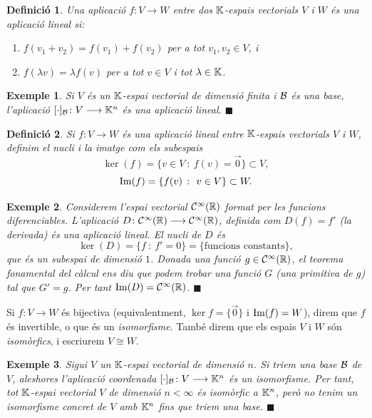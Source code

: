 \documentclass[
  11pt,
]{book}
\numberwithin{dummy}{section}
\theoremstyle{maincolornumbox}
\theoremstyle{blacknumex}
\newtheorem{exampleT}{Exemple}[chapter]
\theoremstyle{blacknumbox}
\newtheorem{definitionT}{Definició}[chapter]
\theoremstyle{maincolornum}
\newenvironment{definition}{\begin{dBox}\begin{definitionT}}{\end{definitionT}\end{dBox}}
\newenvironment{example}{\begin{exampleT}}{\hfill{\tiny\ensuremath{\blacksquare}}\end{exampleT}}
\newlength\esp
\begin{document}
\begin{definition}

Una aplicació \(f\colon V\to W\) entre dos \(\mathbb{K}\)-espais vectorials \(V\) i
\(W\) és una \emph{aplicació lineal} si:

\begin{enumerate}
\def\labelenumi{\arabic{enumi}.}
\item
  \(f(v_1+v_2) = f(v_1) + f(v_2)\) per a tot \(v_1,v_2\in V\), i
\item
  \(f(\lambda v) = \lambda f(v)\) per a tot \(v\in V\) i tot
  \(\lambda\in\mathbb{K}\).
\end{enumerate}

\end{definition}

\begin{example}
Si \(V\) és un \(\mathbb{K}\)-espai vectorial de dimensió finita i \(\mathcal{B}\) és una
base, l'aplicació \([\cdot]_{\mathcal{B}}\colon V\longrightarrow \mathbb{K}^n\) és una aplicació
lineal.
\end{example}

\begin{definition}
Si \(f\colon V\to W\) és una aplicació lineal entre \(\mathbb{K}\)-espais vectorials
\(V\) i \(W\), definim el \emph{nucli} i la \emph{imatge} com els subespais
\[\ker(f) = \{v\in V~\colon~ f(v)=\vec 0\}\subset V,\]
\[\operatorname{Im}(f) = \{f(v)~\colon~ v\in V\}\subset W.\]
\end{definition}

\begin{example}
\protect\hypertarget{exm:derivada}{}\label{exm:derivada}Considerem l'espai
vectorial \(\mathcal{C}^\infty(\mathbb{R})\) format per les funcions diferenciables.
L'aplicació \(D\colon \mathcal{C}^\infty(\mathbb{R})\longrightarrow \mathcal{C}^\infty(\mathbb{R})\), definida com
\(D(f) = f'\) (la derivada) és una aplicació lineal. El nucli de \(D\) és
\[\ker(D)=\{f~\colon~ f'=0\} = \{\text{funcions constants}\},\] que és
un subespai de dimensió \(1\). Donada una funció \(g\in\mathcal{C}^\infty(\mathbb{R})\),
el teorema fonamental del càlcul ens diu que podem trobar una funció \(G\)
(una primitiva de \(g\)) tal que \(G'=g\). Per tant
\(\operatorname{Im}(D)=\mathcal{C}^\infty(\mathbb{R})\).
\end{example}

Si \(f\colon V\to W\) és bijectiva (equivalentment, \(\ker f = \{\vec 0\}\)
i \(\operatorname{Im}(f)=W\)), direm que \(f\) és invertible, o que és un \emph{isomorfisme}.
També direm que els espais \(V\) i \(W\) són \emph{isomòrfics}, i escriurem
\(V\cong W\).

\begin{example}
Sigui \(V\) un \(\mathbb{K}\)-espai vectorial de dimensió \(n\). Si triem una base
\(\mathcal{B}\) de \(V\), aleshores l'aplicació coordenada
\([\cdot]_{\mathcal{B}}\colon V\longrightarrow\mathbb{K}^n\) és un isomorfisme. Per tant, tot
\(\mathbb{K}\)-espai vectorial \(V\) de dimensió \(n<\infty\) és isomòrfic a \(\mathbb{K}^n\),
però no tenim un isomorfisme concret de \(V\) amb \(\mathbb{K}^n\) fins que triem
una base.
\end{example}
\end{document}
